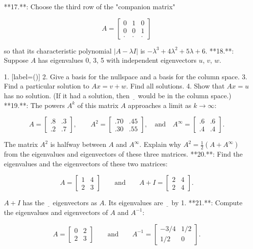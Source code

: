 

**17.**: Choose the third row of the "companion matrix"

\[A=\begin{bmatrix}0&1&0\\ 0&0&1\\ .&.&.\end{bmatrix}\]

so that its characteristic polynomial \(|A-\lambda I|\) is \(-\lambda^{3}+4\lambda^{2}+5\lambda+6\).
**18.**: Suppose \(A\) has eigenvalues 0, 3, 5 with independent eigenvectors \(u\), \(v\), \(w\).

1. [label=()]
2. Give a basis for the nullspace and a basis for the column space.
3. Find a particular solution to \(Ax=v+w\). Find all solutions.
4. Show that \(Ax=u\) has no solution. (If it had a solution, then \(\underline{\phantom{x}}\) would be in the column space.)
**19.**: The powers \(A^{k}\) of this matrix \(A\) approaches a limit as \(k\to\infty\):

\[A=\begin{bmatrix}.8&.3\\ .2&.7\end{bmatrix},\qquad A^{2}=\begin{bmatrix}.70&.45\\ .30&.55\end{bmatrix},\quad\text{and}\quad A^{\infty}=\begin{bmatrix}.6&.6\\ .4&.4\end{bmatrix}.\]

The matrix \(A^{2}\) is halfway between \(A\) and \(A^{\infty}\). Explain why \(A^{2}=\frac{1}{2}(A+A^{\infty})\) from the eigenvalues and eigenvectors of these three matrices.
**20.**: Find the eigenvalues and the eigenvectors of these two matrices:

\[A=\begin{bmatrix}1&4\\ 2&3\end{bmatrix}\qquad\text{and}\qquad A+I=\begin{bmatrix}2&4\\ 2&4\end{bmatrix}.\]

\(A+I\) has the \(\underline{\phantom{x}}\) eigenvectors as \(A\). Its eigenvalues are \(\underline{\phantom{x}}\) by 1.
**21.**: Compute the eigenvalues and eigenvectors of \(A\) and \(A^{-1}\):

\[A=\begin{bmatrix}0&2\\ 2&3\end{bmatrix}\qquad\text{and}\qquad A^{-1}=\begin{bmatrix}-3/4&1/2\\ 1/2&0\end{bmatrix}.\]

